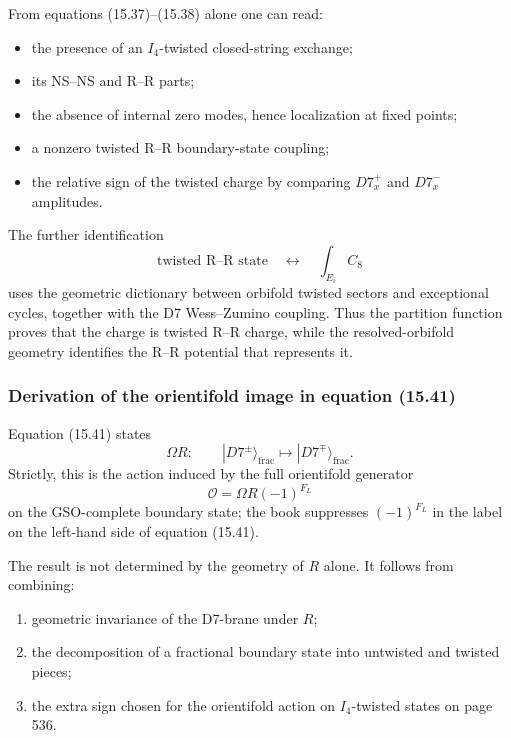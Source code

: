 \documentclass[
  10pt,
  a4paper,
  openany]{book}
\providecommand{\tightlist}{%
  \setlength{\itemsep}{0pt}\setlength{\parskip}{0pt}}
\begin{document}
From equations (15.37)--(15.38) alone one can read:

\begin{itemize}
\tightlist
\item
  the presence of an \(I_4\)-twisted closed-string exchange;
\item
  its NS--NS and R--R parts;
\item
  the absence of internal zero modes, hence localization at fixed
  points;
\item
  a nonzero twisted R--R boundary-state coupling;
\item
  the relative sign of the twisted charge by comparing \(D7_x^+\) and
  \(D7_x^-\) amplitudes.
\end{itemize}

The further identification \[
\text{twisted R--R state}
\quad\longleftrightarrow\quad
\int_{E_i}C_8
\] uses the geometric dictionary between orbifold twisted sectors and
exceptional cycles, together with the D7 Wess--Zumino coupling. Thus the
partition function proves that the charge is twisted R--R charge, while
the resolved-orbifold geometry identifies the R--R potential that
represents it.

\subsubsection{Derivation of the orientifold image in equation
(15.41)}\label{derivation-of-the-orientifold-image-in-equation-15.41}

Equation (15.41) states \[
\Omega R:
\qquad
|D7^\pm\rangle_{\mathrm{frac}}
\longmapsto
|D7^\mp\rangle_{\mathrm{frac}}.
\] Strictly, this is the action induced by the full orientifold
generator \[
\mathcal O
=
\Omega R(-1)^{F_L}
\] on the GSO-complete boundary state; the book suppresses
\((-1)^{F_L}\) in the label on the left-hand side of equation (15.41).

The result is not determined by the geometry of \(R\) alone. It follows
from combining:

\begin{enumerate}
\def\labelenumi{\arabic{enumi}.}
\tightlist
\item
  geometric invariance of the D7-brane under \(R\);
\item
  the decomposition of a fractional boundary state into untwisted and
  twisted pieces;
\item
  the extra sign chosen for the orientifold action on \(I_4\)-twisted
  states on page 536.
\end{enumerate}
\end{document}
